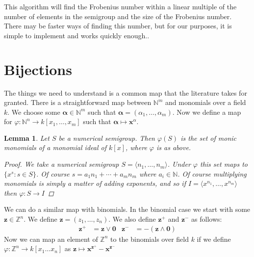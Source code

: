 \documentclass[11pt]{amsart}
\theoremstyle{plain}
\newtheorem{lemma}{Lemma}
\theoremstyle{definition}
\begin{document}
This algorithm will find the Frobenius number within a linear multiple of the number of elements in the semigroup and the size of the Frobenius number. There may be faster ways of finding this number, but for our purposes, it is simple to implement and works quickly enough.\cite{frobmask}.

\section{Bijections}
The things we need to understand is a common map that the literature takes for
granted. There is a straightforward map between $\mathbb{N}^m$ and monomials
over a field $k$. We choose some $\mathbf{\alpha}\in \mathbb{N}^m$ such that
$\mathbf{\alpha}=(\alpha_1,\dots,\alpha_m)$. Now we define a map for
$\varphi:\mathbb{N}^n\to k[x_1,\dots,x_m]$ such that $\mathbf{\alpha}\mapsto
\mathbf{x}^\alpha$.

\begin{lemma}
Let $S$ be a numerical semigroup.  Then $\varphi(S)$ is the set of monic
monomials of a monomial ideal of $k[x]$, where $\varphi$ is as above.
\begin{proof}
  We take a numerical semigroup $S=\langle n_1,\dots,n_m\rangle$. Under
$\varphi$ this set maps to $\{x^{s}:s\in S\}$. Of course $s=a_1n_1+\cdots+a_mn_m$
where $a_i\in \mathbb{N}$. Of course multiplying monomials is simply a matter
of adding exponents, and so if $I=\langle x^{n_1},\dots,x^{n_m}\rangle$ then
$\varphi:S\to I$
\end{proof}
\end{lemma}

We can do a similar map with binomials.
In the binomial case we start with some $\mathbf{z}\in \mathbb{Z}^n$.
We define $\mathbf{z}=(z_1,\dots,z_n)$.
We also define $\mathbf{z}^+$ and $\mathbf{z}^-$ as follows:
\begin{align*}
  \mathbf{z}^+&=\mathbf{z}\vee\mathbf{0}&
  \mathbf{z}^-&=-(\mathbf{z}\wedge\mathbf{0})
\end{align*}
Now we can map an element of $\mathbb{Z}^n$ to the binomials over field $k$ if
we define $\varphi:\mathbb{Z}^n\to k[x_1\dots x_n]$ as $\mathbf{z}\mapsto
\mathbf{x}^{\mathbf{z}^+}-\mathbf{x}^{\mathbf{z}^-}$
\end{document}
